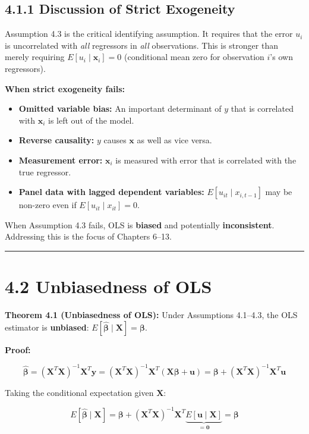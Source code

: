 \subsection{4.1.1 Discussion of Strict Exogeneity}

Assumption 4.3 is the critical identifying assumption. It requires that the error $u_i$ is uncorrelated with \textit{all} regressors in \textit{all} observations. This is stronger than merely requiring $E[u_i \mid \mathbf{x}_i] = 0$ (conditional mean zero for observation $i$'s own regressors).

\textbf{When strict exogeneity fails:}
\begin{itemize}
\item \textbf{Omitted variable bias:} An important determinant of $y$ that is correlated with $\mathbf{x}_i$ is left out of the model.
\item \textbf{Reverse causality:} $y$ causes $\mathbf{x}$ as well as vice versa.
\item \textbf{Measurement error:} $\mathbf{x}_i$ is measured with error that is correlated with the true regressor.
\item \textbf{Panel data with lagged dependent variables:} $E[u_{it} \mid x_{i,t-1}]$ may be non-zero even if $E[u_{it} \mid x_{it}] = 0$.
\end{itemize}

When Assumption 4.3 fails, OLS is \textbf{biased} and potentially \textbf{inconsistent}. Addressing this is the focus of Chapters 6--13.

\medskip\hrule\medskip

\section{4.2 Unbiasedness of OLS}

\textbf{Theorem 4.1 (Unbiasedness of OLS):} Under Assumptions 4.1--4.3, the OLS estimator is \textbf{unbiased}: $E[\hat{\boldsymbol{\beta}} \mid \mathbf{X}] = \boldsymbol{\beta}$.

\textbf{Proof:}

\[
\hat{\boldsymbol{\beta}} = (\mathbf{X}^T\mathbf{X})^{-1}\mathbf{X}^T\mathbf{y} = (\mathbf{X}^T\mathbf{X})^{-1}\mathbf{X}^T(\mathbf{X}\boldsymbol{\beta} + \mathbf{u}) = \boldsymbol{\beta} + (\mathbf{X}^T\mathbf{X})^{-1}\mathbf{X}^T\mathbf{u}
\]

Taking the conditional expectation given $\mathbf{X}$:

\[
E[\hat{\boldsymbol{\beta}} \mid \mathbf{X}] = \boldsymbol{\beta} + (\mathbf{X}^T\mathbf{X})^{-1}\mathbf{X}^T \underbrace{E[\mathbf{u} \mid \mathbf{X}]}_{= \mathbf{0}} = \boldsymbol{\beta}
\]

